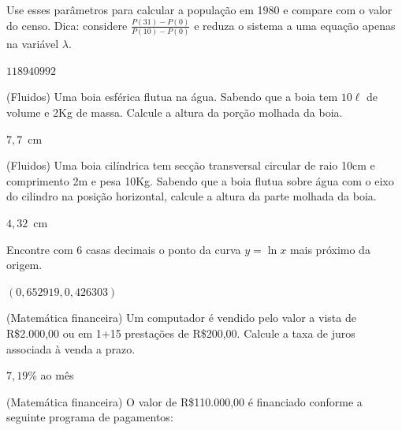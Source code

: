 \begin{ex}
\begin{exer}
Use esses parâmetros para calcular a população em 1980 e compare com o valor do censo. Dica: considere $\frac{P(31)-P(0)}{P(10)-P(0)}$ e reduza o sistema a uma equação apenas na variável $\lambda$.
\end{exer}
\begin{resp}

$118940992$

\end{resp}

\begin{exer}(Fluidos) \label{boiaesf} Uma boia esférica flutua na água. Sabendo que a boia tem $10\ell$ de volume e 2Kg de massa. Calcule a altura da porção molhada da boia.
\end{exer}
\begin{resp}

$7,7$~cm

\end{resp}

\begin{exer}(Fluidos) \label{boiacil} Uma boia cilíndrica tem secção transversal circular de raio 10cm e comprimento 2m e pesa 10Kg. Sabendo que a boia flutua sobre água com o eixo do cilindro na posição horizontal, calcule a altura da parte molhada da boia.
\end{exer}
\begin{resp}

$4,32$~cm

\end{resp}

\begin{exer} Encontre com 6 casas decimais o ponto da curva $y=\ln x$ mais próximo da origem.
\end{exer}
\begin{resp}

$(0,652919, 0,426303)$

\end{resp}


\begin{exer}(Matemática financeira) Um computador é vendido pelo valor a vista de R\$2.000,00 ou em 1+15 prestações de R\$200,00. Calcule a taxa de juros associada à venda a prazo.
\end{exer}

\begin{resp}

$7,19$\% ao mês

\end{resp}

\begin{exer}(Matemática financeira) O valor de R\$110.000,00 é financiado conforme a seguinte programa de pagamentos:


\end{exer}
\end{ex}
